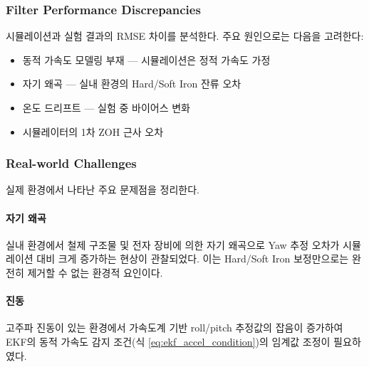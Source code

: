         \subsubsection{Filter Performance Discrepancies}
            시뮬레이션과 실험 결과의 RMSE 차이를 분석한다. 주요 원인으로는 다음을 고려한다:\\
            
            \begin{itemize}
                \item 동적 가속도 모델링 부재 — 시뮬레이션은 정적 가속도 가정
                \item 자기 왜곡 — 실내 환경의 Hard/Soft Iron 잔류 오차
                \item 온도 드리프트 — 실험 중 바이어스 변화
                \item 시뮬레이터의 1차 ZOH 근사 오차
            \end{itemize}

        \subsubsection{Real-world Challenges}
            실제 환경에서 나타난 주요 문제점을 정리한다.\\

            \paragraph{자기 왜곡}
                실내 환경에서 철제 구조물 및 전자 장비에 의한 자기 왜곡으로 Yaw 추정 오차가 시뮬레이션 대비 크게 증가하는 현상이 관찰되었다. 이는 Hard/Soft Iron 보정만으로는 완전히 제거할 수 없는 환경적 요인이다.\\

            \paragraph{진동}
                고주파 진동이 있는 환경에서 가속도계 기반 roll/pitch 추정값의 잡음이 증가하여 EKF의 동적 가속도 감지 조건(식 \eqref{eq:ekf_accel_condition})의 임계값 조정이 필요하였다.\\